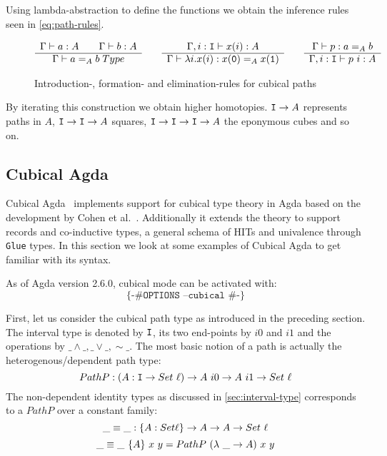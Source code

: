 Using lambda-abstraction to define the functions we obtain the inference rules
seen in \autoref{eq:path-rules}.

\begin{figure}
\begin{equation*}
  \begin{array}[t]{c}
    \Gamma \vdash a : A \qquad \Gamma \vdash b : A\\
    \hline
    \Gamma \vdash a =_A b \; Type\\
  \end{array}
  \qquad
  \begin{array}[t]{c}
    \Gamma, i : \texttt{I} \vdash x(i) : A\\
    \hline
    \Gamma \vdash \lambda i.x(i) : x(\texttt{0}) =_A x(\texttt{1})\\
  \end{array}
  \qquad
  \begin{array}[t]{c}
    \Gamma \vdash p : a =_A b\\
    \hline
    \Gamma, i : \texttt{I} \vdash p~i : A
  \end{array}
\end{equation*}
  \caption{Introduction-, formation- and elimination-rules for cubical paths}
  \label{eq:path-rules}
\end{figure}

By iterating this construction we obtain higher homotopies. $\texttt{I} \rightarrow A$
represents paths in $A$, $\texttt{I} \rightarrow \texttt{I} \rightarrow A$ squares, $\texttt{I} \rightarrow \texttt{I} \rightarrow \texttt{I} \rightarrow A$ the
eponymous cubes and so on.

\subsection{Cubical Agda}
Cubical Agda~\cite{vezzosi2021cubical} implements support for cubical type
theory in Agda based on the development by Cohen et al.~\cite{cohen2016cubical}.
Additionally it extends the theory to support records and co-inductive types, a
general schema of HITs and univalence through \texttt{Glue} types. In this
section we look at some examples of Cubical Agda to get familiar with its
syntax.

As of Agda version 2.6.0, cubical mode can be activated with:
\[\texttt{\{-\# OPTIONS --cubical \#-\}}\]

First, let us consider the cubical path type as introduced in the preceding
section. The interval type is denoted by $\texttt{I}$, its two end-points by $i0$ and
$i1$ and the operations by $\_\land\_, \_\lor\_, \sim\_$. The most basic notion
of a path is actually the heterogenous/dependent path type:
\[PathP : (A : \texttt{I} \rightarrow Set~\ell) \rightarrow A~i0 \rightarrow A~i1 \rightarrow Set~\ell\]
The non-dependent identity types as discussed in \autoref{sec:interval-type}
corresponds to a $PathP$ over a constant family:
\[
  \_\equiv\_ : \{A : Set \ell\} \rightarrow A \rightarrow A \rightarrow Set~\ell
\] \[
  \_\equiv\_~\{A\}~x~y = PathP~(\lambda~\_ \rightarrow A)~x~y
\]

